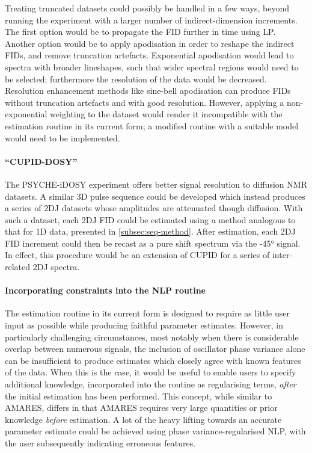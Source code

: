 Treating truncated datasets could possibly be handled in a few ways,
beyond running the experiment with a larger number of indirect-dimension
increments. The first option would be to propagate the \ac{FID} further in time
using \ac{LP}. Another option would be to apply apodisation in order to reshape
the indirect \acp{FID}, and remove truncation artefacts.
Exponential apodisation would lead to spectra with broader lineshapes, such
that wider spectral regions would need to be selected; furthermore the
resolution of the data would be decreased.
Resolution enhancement methods like sine-bell apodisation can
produce \acp{FID} without truncation artefacts and with good resolution.
However, applying a non-exponential weighting to the
dataset would render it incompatible with the estimation routine in its
current form; a modified routine with a suitable model would need to
be implemented.

\paragraph{``\ac{CUPID}-\ac{DOSY}''}
The \ac{PSYCHE}-i\ac{DOSY} experiment offers better signal resolution to
diffusion \ac{NMR} datasets.
A similar \ac{3D} pulse sequence could be developed
which instead produces a series of \ac{2DJ} datasets whose amplitudes are
attenuated though diffusion. With such a dataset, each \ac{2DJ} \ac{FID} could
be estimated using a method analogous to that for \ac{1D} data, presented in
\cref{subsec:seq-method}. After estimation, each \ac{2DJ} \ac{FID} increment
could then be recast as a pure shift spectrum via the \ang{-45} signal. In
effect, this procedure would be an extension of \ac{CUPID} for a series of
inter-related \ac{2DJ} spectra.

\paragraph{Incorporating constraints into the \ac{NLP} routine}
The estimation routine in its current form is designed to require as little
user input as possible while producing faithful parameter estimates. However,
in particularly challenging circumstances, most notably when
there is considerable overlap between numerous signals, the inclusion of
oscillator phase variance alone can be insufficient to produce estimates which
closely agree with known features of the data. When this is the case, it would
be useful to enable users to specify additional knowledge, incorporated into
the routine as regularising terms, \emph{after} the initial estimation has been
performed. This concept, while similar to \ac{AMARES}, differs
in that \ac{AMARES} requires very large quantities or prior knowledge
\emph{before} estimation. A lot of the heavy lifting towards an accurate
parameter estimate could be achieved using phase variance-regularised \ac{NLP},
with the user subsequently indicating erroneous features.

